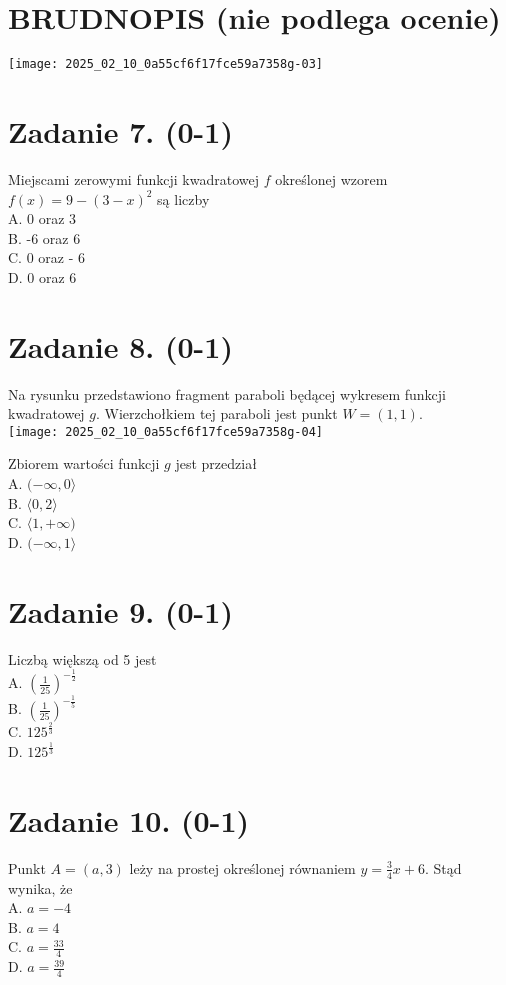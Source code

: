 \documentclass[10pt]{article}
\begin{document}
\section*{BRUDNOPIS (nie podlega ocenie)}
\begin{center}
\texttt{[image: 2025\_02\_10\_0a55cf6f17fce59a7358g-03]}
\end{center}

\section*{Zadanie 7. (0-1)}
Miejscami zerowymi funkcji kwadratowej \(f\) określonej wzorem \(f(x)=9-(3-x)^{2}\) są liczby\\
A. 0 oraz 3\\
B. -6 oraz 6\\
C. 0 oraz - 6\\
D. 0 oraz 6

\section*{Zadanie 8. (0-1)}
Na rysunku przedstawiono fragment paraboli będącej wykresem funkcji kwadratowej \(g\). Wierzchołkiem tej paraboli jest punkt \(W=(1,1)\).\\
\texttt{[image: 2025\_02\_10\_0a55cf6f17fce59a7358g-04]}

Zbiorem wartości funkcji \(g\) jest przedział\\
A. \((-\infty, 0\rangle\)\\
B. \(\langle 0,2\rangle\)\\
C. \(\langle 1,+\infty)\)\\
D. \((-\infty, 1\rangle\)

\section*{Zadanie 9. (0-1)}
Liczbą większą od 5 jest\\
A. \(\left(\frac{1}{25}\right)^{-\frac{1}{2}}\)\\
B. \(\left(\frac{1}{25}\right)^{-\frac{1}{5}}\)\\
C. \(125^{\frac{2}{3}}\)\\
D. \(125^{\frac{1}{3}}\)

\section*{Zadanie 10. (0-1)}
Punkt \(A=(a, 3)\) leży na prostej określonej równaniem \(y=\frac{3}{4} x+6\). Stąd wynika, że\\
A. \(a=-4\)\\
B. \(a=4\)\\
C. \(a=\frac{33}{4}\)\\
D. \(a=\frac{39}{4}\)
\end{document}

